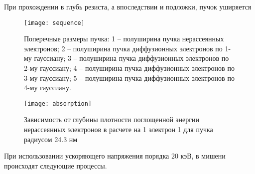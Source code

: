 При прохождении в глубь резиста, а впоследствии и подложки, пучок уширяется
\begin{figure}[h]
    \center
    \texttt{[image: sequence]}
    \caption{Поперечные размеры пучка:
1 -- полуширина пучка нерассеянных электронов;
2 -- полуширина пучка диффузионных электронов по 1-му гауссиану;
3 -- полуширина пучка диффузионных электронов по 2-му гауссиану;
4 -- полуширина пучка диффузионных электронов по 3-му гауссиану;
5 -- полуширина пучка диффузионных электронов по 4-му гауссиану.}
    \label{fig:sequence}
\end{figure}


\begin{figure}[h]
    \center
    \texttt{[image: absorption]}
    \caption{Зависимость от глубины плотности поглощенной энергии нерассеянных электронов в расчете на 1 электрон 1 для пучка радиусом 24.3 нм}
    \label{fig:absorption}
\end{figure}

При использовании ускоряющего напряжения порядка 20 кэВ, в мишени происходят следующие процессы.


